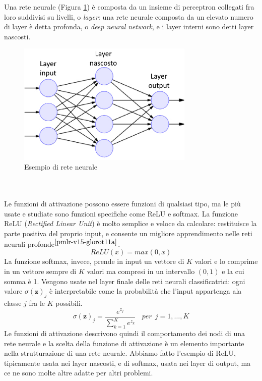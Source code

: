 Una rete neurale (Figura \ref{fig:reteneurale}) è composta da un insieme di perceptron collegati fra loro suddivisi su livelli, o \textit{layer}: una rete neurale composta da un elevato numero di layer è detta profonda, o \textit{deep neural network}, e i layer interni sono detti layer nascosti.
\begin{figure}[b]
	\begin{center}
		\includegraphics[width=0.75\textwidth]{img/reteneurale.jpg}
		\caption{Esempio di rete neurale}
		\label{fig:reteneurale}
	\end{center}
\end{figure}
\\\\
Le funzioni di attivazione possono essere funzioni di qualsiasi tipo, ma le più usate e studiate sono funzioni specifiche come ReLU e softmax. La funzione ReLU (\textit{Rectified Linear Unit}) è molto semplice e veloce da calcolare: restituisce la parte positiva del proprio input, e consente un migliore apprendimento nelle reti neurali profonde$^{\cite{pmlr-v15-glorot11a}}$.
\begin{equation}\label{eq:fun_relu}
ReLU(x) = max(0, x)
\end{equation}
La funzione softmax, invece, prende in input un vettore di $K$ valori e lo comprime in un vettore sempre di $K$ valori ma compresi in un intervallo $(0, 1)$ e la cui somma è 1. Vengono usate nel layer finale delle reti neurali classificatrici: ogni valore $\sigma(\textbf{z})_j$  è interpretabile come la probabilità che l'input appartenga ala classe $j$ fra le $K$ possibili.
\begin{equation}\label{eq:fun_softmax}
\sigma(\textbf{z})_j = \frac{e^{z_j}}{\sum_{k=1}^K e^{z_k}}\:\:\:\:per\:\:j = 1,\ldots,K
\end{equation}
Le funzioni di attivazione descrivono quindi il comportamento dei nodi di una rete neurale e la scelta della funzione di attivazione è un elemento importante nella strutturazione di una rete neurale. Abbiamo fatto l'esempio di ReLU, tipicamente usata nei layer nascosti, e di softmax, usata nei layer di output, ma ce ne sono molte altre adatte per altri problemi.
